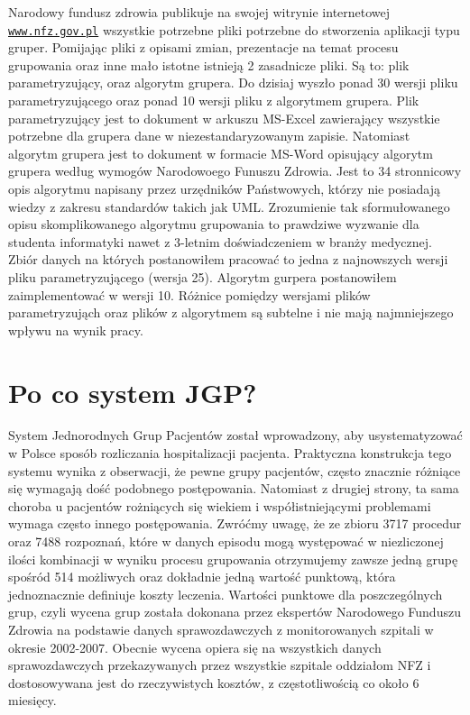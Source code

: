 Narodowy fundusz zdrowia publikuje na swojej witrynie internetowej \underline{\texttt{www.nfz.gov.pl}} wszystkie potrzebne pliki potrzebne do stworzenia aplikacji typu gruper. Pomijając pliki z opisami zmian, prezentacje na temat procesu grupowania oraz inne mało istotne istnieją 2 zasadnicze pliki. Są to: plik parametryzujący, oraz algorytm grupera. Do dzisiaj wyszło ponad 30 wersji pliku parametryzującego oraz ponad 10 wersji pliku z algorytmem grupera.
Plik parametryzujący jest to dokument w arkuszu MS-Excel zawierający wszystkie potrzebne dla grupera dane w niezestandaryzowanym zapisie. Natomiast algorytm grupera jest to dokument w formacie MS-Word opisujący algorytm grupera według wymogów Narodowoego Funuszu Zdrowia. Jest to 34 stronnicowy opis algorytmu napisany przez urzędników Państwowych, którzy nie posiadają wiedzy z zakresu standardów takich jak UML. Zrozumienie tak sformułowanego opisu skomplikowanego algorytmu grupowania to prawdziwe wyzwanie dla studenta informatyki nawet z 3-letnim doświadczeniem w branży medycznej. Zbiór danych na których postanowiłem pracować to jedna z najnowszych wersji pliku parametryzującego (wersja 25). Algorytm gurpera postanowiłem zaimplementować w wersji 10. Różnice pomiędzy wersjami plików parametryzująch oraz plików z algorytmem są subtelne i nie mają najmniejszego wpływu na wynik pracy.


\section{Po co system JGP?}
\label{sec:poCoJGP}

System Jednorodnych Grup Pacjentów został wprowadzony, aby usystematyzować w Polsce sposób rozliczania hospitalizacji pacjenta. Praktyczna konstrukcja tego systemu wynika z obserwacji, że pewne grupy pacjentów, często znacznie różniące się wymagają dość podobnego postępowania. Natomiast z drugiej strony, ta sama choroba u pacjentów rożniących się wiekiem i współistniejącymi problemami wymaga często innego postępowania.
Zwróćmy uwagę, że ze zbioru 3717 procedur oraz 7488 rozpoznań, które w danych episodu mogą występować w niezliczonej ilości kombinacji w wyniku procesu grupowania otrzymujemy zawsze jedną grupę spośród 514 możliwych oraz dokładnie jedną wartość punktową, która jednoznacznie definiuje koszty leczenia.
Wartości punktowe dla poszczególnych grup, czyli wycena grup została dokonana przez ekspertów Narodowego Funduszu Zdrowia na podstawie danych sprawozdawczych z monitorowanych szpitali w okresie 2002-2007. Obecnie wycena opiera się na wszystkich danych sprawozdawczych przekazywanych przez wszystkie szpitale oddziałom NFZ i dostosowywana jest do rzeczywistych kosztów, z częstotliwością co około 6 miesięcy.


